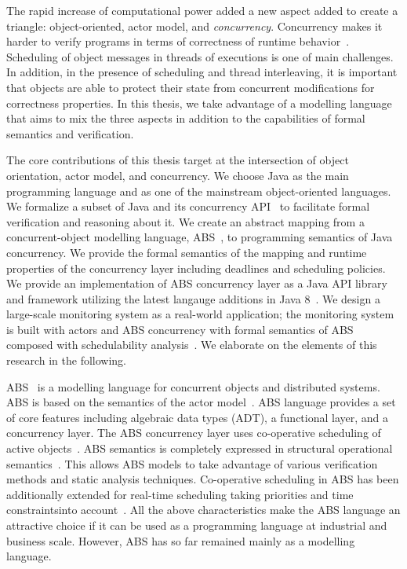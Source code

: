 The rapid increase of computational power added a new aspect added to create a triangle: object-oriented, actor model, and \emph{concurrency}.
Concurrency makes it harder to verify programs in terms of correctness of runtime behavior~\cite{Herlihy:1990:linear,johnsen:history,agha:predictive:safety}. 
Scheduling of object messages in threads of executions is one of main challenges.
In addition, in the presence of scheduling and thread interleaving, it is important that objects are able to protect their state from concurrent modifications for correctness properties.
In this thesis, we take advantage of a modelling language that aims to mix the three aspects in addition to the capabilities of formal semantics and verification.

The core contributions of this thesis target at the intersection of object 
orientation, actor model, and concurrency.
We choose Java as the main programming language and as one of the mainstream 
object-oriented languages. 
We formalize a subset of Java and its concurrency API~\cite{jsr166} to 
facilitate formal verification and reasoning about it.
We create an abstract mapping from a concurrent-object modelling language, 
ABS~\cite{johnsen2012abs}, to programming semantics of Java concurrency. 
We provide the formal semantics of the mapping and runtime properties of 
the concurrency layer including deadlines and scheduling policies.
We provide an implementation of ABS concurrency layer as a Java API library 
and framework utilizing the latest langauge additions 
in Java 8~\cite{jsr335:lambda:translation}.
We design a large-scale monitoring system as a real-world application; 
the monitoring system is built with actors and ABS concurrency 
with formal semantics of ABS composed with 
schedulability analysis~\cite{fersman2007task}.
We elaborate on the elements of this research in the following.

ABS~\cite{johnsen2012abs,hahnlehjlssw11} is a modelling language for concurrent objects and distributed systems.
ABS is based on the semantics of the actor model~\cite{actors:agha}.
ABS language provides a set of core features including algebraic data types (ADT), a functional layer, and a concurrency layer.
The ABS concurrency layer uses co-operative scheduling of active objects~\cite{creol:broch:owe}.
ABS semantics is completely expressed in structural operational semantics~\cite{plotkin:sos}.
This allows ABS models to take advantage of various verification methods and static analysis techniques.
% 
Co-operative scheduling in ABS has been additionally extended for real-time scheduling taking priorities and time constraintsinto account~\cite{bjork2013:rtabs,johnsen2012modeling}.
All the above characteristics make the ABS language an attractive choice if it
can be used as a programming language at industrial and business scale.
However, ABS has so far remained mainly as a modelling language.

